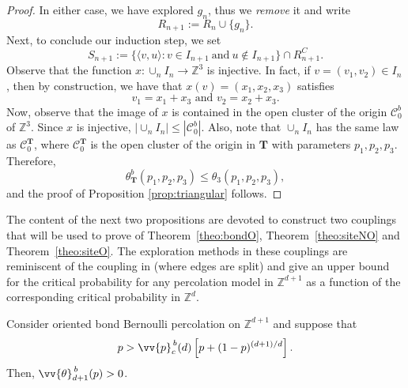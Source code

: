 \documentclass{aptpub}
\newcommand{\Z}{\mathbb{Z}}
\begin{document}
\begin{proof}
In either case, we have explored $g_n$, thus we \textit{remove} it and write
\[ R_{n+1} := R_n \cup \{ g_n \}.\]
Next, to conclude our induction step, we set
\begin{equation*}
  S_{n+1} := \{ \langle v, u \rangle : v \in I_{n+1} \: \mbox{and} \: u \notin I_{n+1} \} \cap R_{n+1}^C.
\end{equation*}
Observe that the function $x: \cup_n I_n \longrightarrow \Z^{3}$ is injective.  
In fact, if $v= (v_1, v_2) \in I_n$, then by construction, we have that $x(v) = (x_1,x_2,x_3)$ satisfies
\[ v_1=x_1+x_3 \mbox{ and }
    v_2=x_2+x_3.\]
Now, observe that the image of $x$ is contained in the  open cluster of the origin $\mathcal{C}^b_0$ of $\Z^{3}$. Since $x$ is injective,  $|\cup_n I_n| \leq |\mathcal{C}^b_0|$.  Also, note that $\cup_{n} I_n$ has the same  law as  $\mathcal{C}^{\mathbf{T}}_0$, where $\mathcal{C}^{\mathbf{T}}_0$ is the  open cluster of the origin in $\mathbf{T}$ with parameters $p_1, p_2,p_3$.  Therefore,
\begin{equation*}
 \theta^b_{\mathbf{T}}(p_1,p_2,p_3) \leq \theta_{3}(p_1,p_2,p_3),
\end{equation*}
and the proof of Proposition \ref{prop:triangular} follows.
\end{proof}


The content of the next two propositions are devoted to construct two couplings that will be used to prove of Theorem~\ref{theo:bondO}, Theorem~\ref{theo:siteNO} and Theorem~\ref{theo:siteO}. The exploration methods in these couplings are reminiscent of the coupling in \cite{GSS} (where edges are split) and give an upper bound for the critical probability for any percolation model in $\Z^{d+1}$ as a function of the corresponding critical probability in $\Z^d$.

\begin{prop}\label{prop:crossover}
Consider oriented bond Bernoulli percolation on $\Z^{d+1}$ and suppose that 
\begin{equation} \label{eq:crossbond}
    p > \vv{p}^{\,b}_c(d) \left[p + (1-p)^{(d+1)/d}\right].
\end{equation}
Then, $\vv{\theta}^{\,b}_{d+1}(p)>0$.
\end{prop}

\end{document}
